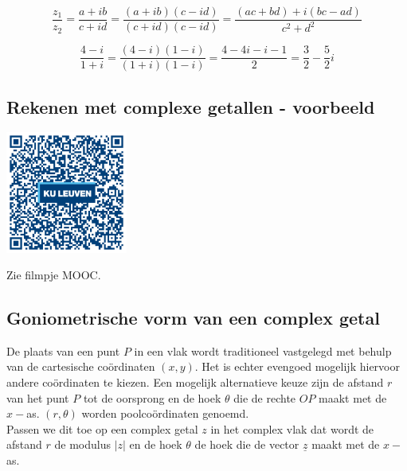 \begin{framed}
\[ \frac{z_{1}}{z_{2}}=\frac{a+ib}{c+id}=\frac{(a+ib)(c-id)}{(c+id)(c-id)}=\frac{(ac+bd)+i(bc-ad)}{c^2 +d^2}  \]
\end{framed}

\begin{voorbeeld}	
\[ \frac{4-i}{1+i}=\frac{(4-i)(1-i)}{(1+i)(1-i)}=\frac{4-4i-i-1}{2}=\frac{3}{2}-\frac{5}{2}i \]
\end{voorbeeld}

\subsection{Rekenen met complexe getallen - voorbeeld}
\begin{minipage}{.25\linewidth}
	\raggedright
	\includegraphics[width=4cm]{3_gonio_complexe_getallen/inputs/QR_Code_REKENENCOMPLVB_module3new}
\end{minipage}
\begin{minipage}{.7\linewidth}
	Zie filmpje MOOC.
\end{minipage}

\subsection{Goniometrische vorm van een complex getal}

De plaats van een punt $P$ in een vlak wordt traditioneel vastgelegd met behulp van de cartesische co\"{o}rdinaten $(x,y)$. Het is echter evengoed mogelijk hiervoor andere co\"{o}rdinaten te kiezen. Een mogelijk alternatieve keuze zijn de afstand $r$ van het punt $P$ tot de oorsprong en de hoek $\theta$ die de rechte $OP$ maakt met de $x-$as. $(r,\theta)$ worden poolco\"{o}rdinaten genoemd.\\
Passen we dit toe op een complex getal $z$ in het complex vlak dat wordt de afstand $r$ de modulus $|z|$ en de hoek $\theta$ de hoek die de vector $\underline{z}$ maakt met de $x-$as.\\

